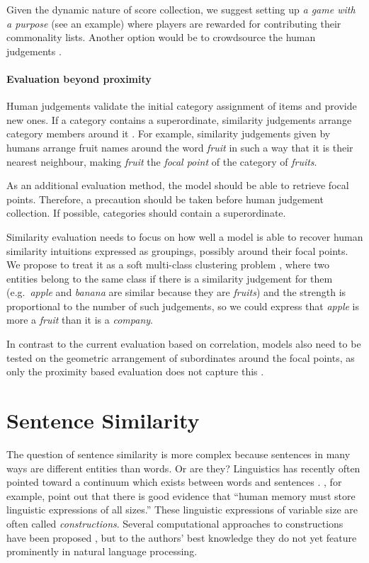 \documentclass[11pt]{article}
\begin{document}
Given the dynamic nature of score collection, we suggest setting up \emph{a game with a purpose} (see  an example) where players are rewarded for contributing their commonality lists. Another option would be to crowdsource the human judgements \cite{doi:10.1080/17470218.2015.1051065}.

\paragraph{Evaluation beyond proximity}

Human judgements validate the initial category assignment of items and provide new ones. If a category contains a superordinate, similarity judgements arrange category members around it \cite{1986-13502-00119860101}. For example, similarity judgements given by humans arrange fruit names around the word \textit{fruit} in such a way that it is their nearest neighbour, making \textit{fruit} the \emph{focal point} of the category of \textit{fruits}.

As an additional evaluation method, the model should be able to retrieve focal points. Therefore, a precaution should be taken before human judgement collection. If possible, categories should contain a superordinate.

Similarity evaluation needs to focus on how well a model is able to recover human similarity intuitions expressed as groupings, possibly around their focal points. We propose to treat it as a soft multi-class clustering problem \cite{White:2015:WSE:2838931.2838932}, where two entities belong to the same class if there is a similarity judgement for them (e.g.~\textit{apple} and \textit{banana} are similar because they are \textit{fruits}) and the strength is proportional to the number of such judgements, so we could express that \textit{apple} is more a \textit{fruit} than it is a \textit{company}.

In contrast to the current evaluation based on correlation, models also need to be tested on the geometric arrangement of subordinates around the focal points, as only the proximity based evaluation does not capture this \cite{1986-13502-00119860101}.

\section{Sentence Similarity}

The question of sentence similarity is more complex because sentences in many ways are different entities than words. Or are they? Linguistics has recently often pointed toward a continuum which exists between words and sentences \cite{jackendoff2012cambridge}. , for example, point out that there is good evidence that ``human memory must store linguistic expressions of all sizes.'' These linguistic expressions of variable size are often called \emph{constructions}. Several computational approaches to constructions have been proposed \cite{Gaspers2011,chang2012computational}, but to the authors' best knowledge they do not yet feature prominently in natural language processing.
\end{document}
